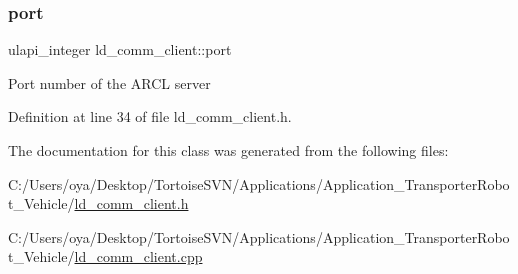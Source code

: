 \subsubsection{\texorpdfstring{port}{port}}
{\footnotesize\ttfamily ulapi\+\_\+integer ld\+\_\+comm\+\_\+client\+::port\hspace{0.3cm}{\ttfamily [private]}}

Port number of the A\+R\+CL server 

Definition at line 34 of file ld\+\_\+comm\+\_\+client.\+h.



The documentation for this class was generated from the following files\+:\begin{DoxyCompactItemize}
\item 
C\+:/\+Users/oya/\+Desktop/\+Tortoise\+S\+V\+N/\+Applications/\+Application\+\_\+\+Transporter\+Robot\+\_\+\+Vehicle/\mbox{\hyperlink{ld__comm__client_8h}{ld\+\_\+comm\+\_\+client.\+h}}\item 
C\+:/\+Users/oya/\+Desktop/\+Tortoise\+S\+V\+N/\+Applications/\+Application\+\_\+\+Transporter\+Robot\+\_\+\+Vehicle/\mbox{\hyperlink{ld__comm__client_8cpp}{ld\+\_\+comm\+\_\+client.\+cpp}}\end{DoxyCompactItemize}
